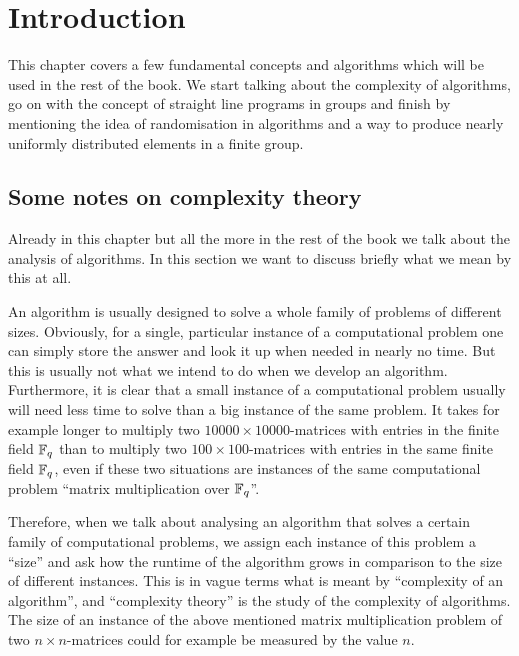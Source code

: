 
\chapter{Introduction}
\label{chap:intro}

This chapter covers a few fundamental concepts and algorithms which
will be used in the rest of the book. We start talking about the
complexity of algorithms, go on with the concept of straight line
programs in groups and finish by mentioning the idea of randomisation
in algorithms and a way to produce nearly uniformly distributed
elements in a finite group.

\section{Some notes on complexity theory}
\label{sec:complexity}

%
Already in this chapter but all the more in the rest of the book we
talk about the analysis of algorithms. In this section we want to
discuss briefly what we mean by this at all.

An algorithm is usually designed to solve a whole family of problems of
different sizes. Obviously, for a single, particular instance of a
computational problem one can simply store the answer and look it up
when needed in nearly no time. But this is usually not what we intend
to do when we develop an algorithm. Furthermore, it is clear that a
small instance of a computational problem usually will need less time
to solve than a big instance of the same problem. It takes for example longer 
to multiply two $10000\times 10000$-matrices with entries in the finite 
field $\mathbb{F}_q$ than to multiply two $100\times 100$-matrices
with entries in the same finite field $\mathbb{F}_q$,
even if these two situations are instances of the same
computational problem ``matrix multiplication over $\mathbb{F}_q$''.

Therefore, when we talk about analysing an algorithm that solves a
certain family of computational problems, we assign each instance of
this problem a ``size'' and ask how the runtime of the algorithm grows
in comparison to the size of different instances. This is in vague terms
what is meant by ``complexity of an algorithm'', and ``complexity
%
theory'' is the study of the complexity of algorithms. The size of an
instance of the above mentioned matrix multiplication problem of two $n
\times n$-matrices could for example be measured by the value $n$.

